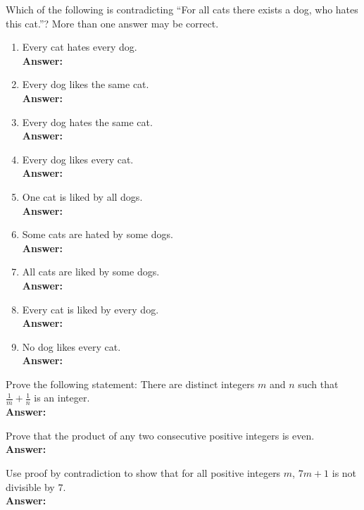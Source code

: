 \documentclass{exercise}
\newcommand{\answer}[1]{\vspace{0.25cm}\\\textbf{Answer:}~#1\vspace{0.25cm}}
\begin{document}
   Which of the following is contradicting ``For all cats there exists a dog, who hates this cat.''? More than one answer may be correct.
    \begin{enumerate}
	    \item Every cat hates every dog.
      \answer{

      }
	    
	    \item Every dog likes the same cat.
      \answer{

      }
	    
	    \item Every dog hates the same cat.
      \answer{

      }
	    
	    \item Every dog likes every cat.
      \answer{

      }
	    
	    \item One cat is liked by all dogs.
      \answer{

      }
	    
	    \item Some cats are hated by some dogs.
      \answer{

      }
	    
	    \item All cats are liked by some dogs.
      \answer{

      }
	    
	    \item Every cat is liked by every dog.
      \answer{

      }
	    
	    \item No dog likes every cat.
      \answer{

      }
    \end{enumerate}

   Prove the following statement: There are distinct integers $m$ and $n$ such that $\frac{1}{m} + \frac{1}{n}$ is an integer.
  \answer{

  }

   Prove that the product of any two consecutive positive integers is even.
  \answer{

  }

   Use proof by contradiction to show that for all positive integers $m$, $7m + 1$ is not divisible by $7$.
  \answer{

  }
\end{document}
